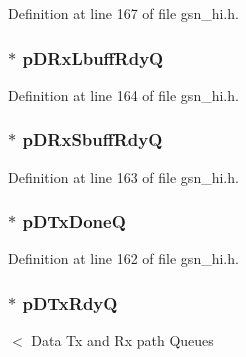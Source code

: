 Definition at line 167 of file gsn\_\-hi.h.

\hypertarget{a00085_a8bdeea2ec46e25ca2dde6fcde3d17ef0}{
\subsubsection[{pDRxLbuffRdyQ}]{$\ast$ {\bf pDRxLbuffRdyQ}}}
\label{a00085_a8bdeea2ec46e25ca2dde6fcde3d17ef0}


Definition at line 164 of file gsn\_\-hi.h.

\hypertarget{a00085_a6b28fb8ac26b8ab3fbe508edcfb6187b}{
\subsubsection[{pDRxSbuffRdyQ}]{$\ast$ {\bf pDRxSbuffRdyQ}}}
\label{a00085_a6b28fb8ac26b8ab3fbe508edcfb6187b}


Definition at line 163 of file gsn\_\-hi.h.

\hypertarget{a00085_a398f238a7e8b465687b31b5662b509e4}{
\subsubsection[{pDTxDoneQ}]{$\ast$ {\bf pDTxDoneQ}}}
\label{a00085_a398f238a7e8b465687b31b5662b509e4}


Definition at line 162 of file gsn\_\-hi.h.

\hypertarget{a00085_a5bae9ee90ebf87d01e751b7870ce7969}{
\subsubsection[{pDTxRdyQ}]{$\ast$ {\bf pDTxRdyQ}}}
\label{a00085_a5bae9ee90ebf87d01e751b7870ce7969}
$<$ Data Tx and Rx path Queues 

